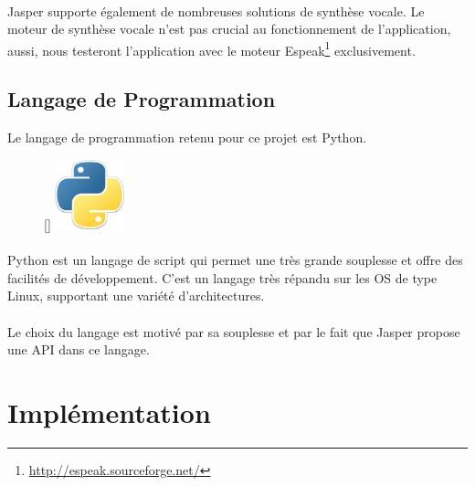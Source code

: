 \documentclass[12pt]{article}
\begin{document}
	    \paragraph{}

	    Jasper supporte également de nombreuses solutions de synthèse vocale. Le moteur de synthèse vocale n'est pas crucial au fonctionnement de l'application, aussi, nous testeront l'application avec le moteur Espeak\footnote{\url{http://espeak.sourceforge.net/}} exclusivement.
    
        \subsection{Langage de Programmation}

        Le langage de programmation retenu pour ce projet est Python.
                \begin{figure}
                	\centering
                	\raisebox{0pt}[\dimexpr{}\baselineskip\relax]{%
                        \includegraphics[width=2cm]{logo-python}%
                    }
                	\caption[Logo de Python]{}
                \end{figure}

        \paragraph{}
        Python est un langage de script qui permet une très grande souplesse et
        offre des facilités de développement. C'est un langage très répandu sur
        les OS de type Linux, supportant une variété d'architectures.

        \paragraph{}
        Le choix du langage est motivé par sa souplesse et par le fait que
        Jasper propose une API dans ce langage.

	\section{Implémentation}

	\FloatBarrier
		
\end{document}
